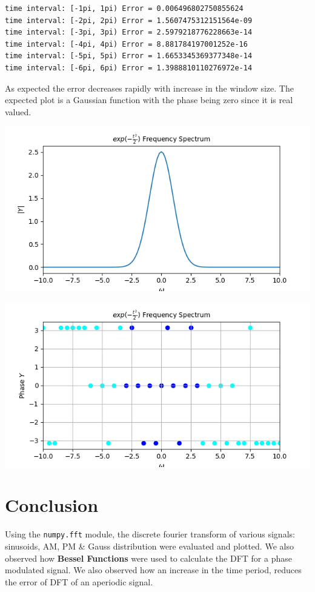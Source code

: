 \documentclass[12pt, a4paper]{report}
\begin{document}
\begin{verbatim}
time interval: [-1pi, 1pi) Error = 0.006496802750855624
time interval: [-2pi, 2pi) Error = 1.5607475312151564e-09
time interval: [-3pi, 3pi) Error = 2.5979218776228663e-14
time interval: [-4pi, 4pi) Error = 8.881784197001252e-16
time interval: [-5pi, 5pi) Error = 1.6653345369377348e-14
time interval: [-6pi, 6pi) Error = 1.3988810110276972e-14
\end{verbatim}

As expected the error decreases rapidly with increase in the window size. The expected plot is a Gaussian function with the phase being zero since it is real valued.

\begin{center}
	\includegraphics[scale=0.8]{Figure_12.png} 
	\label{fig:rawdata}
\end{center}
\clearpage
\begin{center}
	\includegraphics[scale=0.8]{Figure_13.png} 
	\label{fig:rawdata}
\end{center}

\section*{Conclusion}
Using the \texttt{numpy.fft} module, the discrete fourier transform of various signals: sinusoids, AM, PM & Gauss distribution were evaluated and plotted. We also observed how \textbf{Bessel Functions} were used to calculate the DFT for a phase modulated signal. We also observed how an increase in the time period, reduces the error of DFT of an aperiodic signal.
\end{document}
